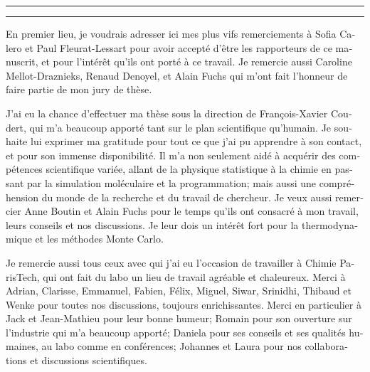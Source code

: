 
\begin{otherlanguage}{french}

\hrule\relax
\vspace*{.9\baselineskip}%
\raggedright{\huge{}}\par%
\vspace*{1.1\baselineskip}%
\hrule\relax
\vspace*{\baselineskip}%
\thispagestyle{empty}

\begingroup
\itshape

En premier lieu, je voudrais adresser ici mes plus vifs remerciements à Sofia
Calero et Paul Fleurat-Lessart pour avoir accepté d'être les rapporteurs de ce
manuscrit, et pour l'intérêt qu'ils ont porté à ce travail. Je remercie aussi
Caroline Mellot-Draznieks, Renaud Denoyel, et Alain Fuchs qui m'ont fait
l'honneur de faire partie de mon jury de thèse.

J'ai eu la chance d'effectuer ma thèse sous la direction de François-Xavier
Coudert, qui m'a beaucoup apporté tant sur le plan scientifique qu'humain. Je
souhaite lui exprimer ma gratitude pour tout ce que j'ai pu apprendre à son
contact, et pour son immense disponibilité. Il m'a non seulement aidé à acquérir
des compétences scientifique variée, allant de la physique statistique à la
chimie en passant par la simulation moléculaire et la programmation; mais aussi
une compréhension du monde de la recherche et du travail de chercheur. Je veux
aussi remercier Anne Boutin et Alain Fuchs pour le temps qu'ils ont consacré à
mon travail, leurs conseils et nos discussions. Je leur dois un intérêt fort
pour la thermodynamique et les méthodes Monte Carlo.

Je remercie aussi tous ceux avec qui j'ai eu l'occasion de travailler à Chimie
ParisTech, qui ont fait du labo un lieu de travail agréable et chaleureux. Merci
à Adrian, Clarisse, Emmanuel, Fabien, Félix, Miguel, Siwar, Srinidhi, Thibaud et
Wenke pour toutes nos discussions, toujours enrichissantes. Merci en particulier
à Jack et Jean-Mathieu pour leur bonne humeur; Romain pour son ouverture sur
l'industrie qui m'a beaucoup apporté; Daniela pour ses conseils et ses qualités
humaines, au labo comme en conférences; Johannes et Laura pour nos
collaborations et discussions scientifiques.


\end{otherlanguage}
